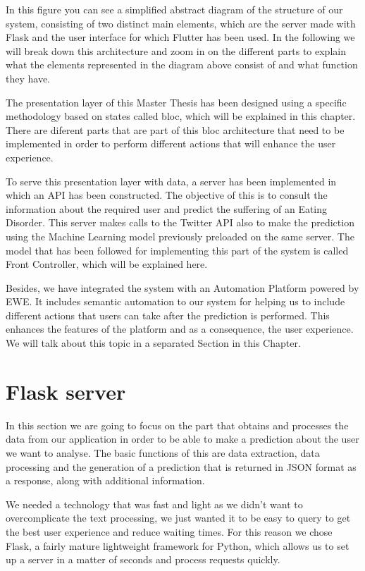 In this figure you can see a simplified abstract diagram of the structure of our system, consisting of two distinct main elements, which are the server made with Flask and the user interface for which Flutter has been used. In the following we will break down this architecture and zoom in on the different parts to explain what the elements represented in the diagram above consist of and what function they have.

The presentation layer of this Master Thesis has been designed using a specific methodology based on states called bloc, which will be explained in this chapter. There are diferent parts that are part of this bloc architecture that need to be implemented in order to perform different actions that will enhance the user experience.

To serve this presentation layer with data, a server has been implemented in which an API has been constructed. The objective of this is to consult the information about the required user and predict the suffering of an Eating Disorder. This server makes calls to the Twitter API also to make the prediction using the Machine Learning model previously preloaded on the same server. The model that has been followed for implementing this part of the system is called Front Controller, which will be explained here.

Besides, we have integrated the system with an Automation Platform powered by EWE. It includes semantic automation to our system for helping us to include different actions that users can take after the prediction is performed. This enhances the features of the platform and as a consequence, the user experience. We will talk about this topic in a separated Section in this Chapter.

\section{Flask server}
\label{sec:server}
 In this section we are going to focus on the part that obtains and processes the data from our application in order to be able to make a prediction about the user we want to analyse. The basic functions of this are data extraction, data processing and the generation of a prediction that is returned in JSON format as a response, along with additional information.
 
 We needed a technology that was fast and light as we didn't want to overcomplicate the text processing, we just wanted it to be easy to query to get the best user experience and reduce waiting times. For this reason we chose Flask, a fairly mature lightweight framework for Python, which allows us to set up a server in a matter of seconds and process requests quickly.
 
